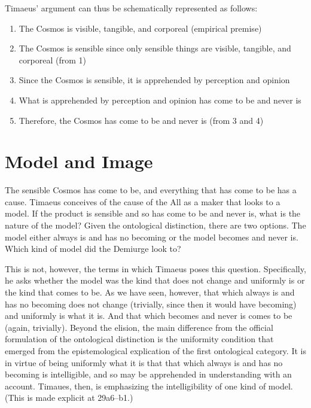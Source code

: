 Timaeus' argument can thus be schematically represented as follows:
\begin{enumerate}[(1)]
	\item The Cosmos is visible, tangible, and corporeal (empirical premise)
	\item The Cosmos is sensible since only sensible things are visible, tangible, and corporeal (from 1)
	\item Since the Cosmos is sensible, it is apprehended by perception and opinion
	\item What is apprehended by perception and opinion has come to be and never is
	\item Therefore, the Cosmos has come to be and never is (from 3 and 4)
\end{enumerate}


\section{Model and Image} %
\label{sec:model_and_image}

The sensible Cosmos has come to be, and everything that has come to be has a cause. Timaeus conceives of the cause of the All as a maker that looks to a model. If the product is sensible and so has come to be and never is, what is the nature of the model? Given the ontological distinction, there are two options. The model either always is and has no becoming or the model becomes and never is. Which kind of model did the Demiurge look to?

This is not, however, the terms in which Timaeus poses this question. Specifically, he asks whether the model was the kind that does not change and uniformly is or the kind that comes to be. As we have seen, however, that which always is and has no becoming does not change (trivially, since then it would have becoming) and uniformly is what it is. And that which becomes and never is comes to be (again, trivially). Beyond the elision, the main difference from the official formulation of the ontological distinction is the uniformity condition that emerged from the epistemological explication of the first ontological category. It is in virtue of being uniformly what it is that that which always is and has no becoming is intelligible, and so may be apprehended in understanding with an account. Timaues, then, is emphasizing the intelligibility of one kind of model. (This is made explicit at 29a6--b1.)

